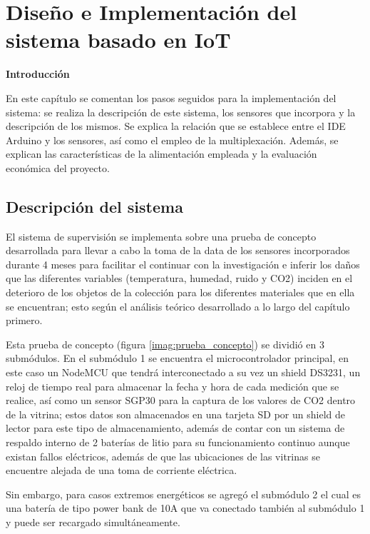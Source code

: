 \chapter{Diseño e Implementación del sistema basado en IoT}\label{cap: }

        \textbf{\Large Introducción}\vspace{0.5cm}
        
    En este capítulo se comentan los pasos seguidos para la implementación del sistema: se realiza la descripción de este sistema, los sensores que incorpora y la descripción de los mismos. 
    Se explica la relación que se establece entre el IDE Arduino y los sensores, así como el empleo de la multiplexación. Además, se explican las características de la alimentación empleada y la evaluación económica del proyecto.
    
\section{Descripción del sistema} \label{descripcion_sistema}

    El sistema de supervisión se implementa sobre una prueba de concepto desarrollada para llevar a cabo la toma de la data de los sensores incorporados durante 4 meses para facilitar el continuar con la investigación e inferir los daños que las diferentes variables (temperatura, humedad, ruido y CO2) inciden en el deterioro de los objetos de la colección para los diferentes materiales que en ella se encuentran; esto según el análisis teórico desarrollado a lo largo del capítulo primero.

    Esta prueba de concepto (figura \ref{imag:prueba_concepto}) se dividió en 3 submódulos. En el submódulo 1 se encuentra el microcontrolador principal, en este caso un NodeMCU que tendrá interconectado a su vez un shield DS3231, un reloj de tiempo real para almacenar la fecha y hora de cada medición que se realice, así como un sensor SGP30 para la captura de los valores de CO2 dentro de la vitrina; estos datos son almacenados en una tarjeta SD por un shield de lector para este tipo de almacenamiento, además de contar con un sistema de respaldo interno de 2 baterías de litio para su funcionamiento continuo aunque existan fallos eléctricos, además de que las ubicaciones de las vitrinas se encuentre alejada de una toma de corriente eléctrica.

    Sin embargo, para casos extremos energéticos se agregó el submódulo 2 el cual es una batería de tipo power bank de 10A que va conectado también al submódulo 1 y puede ser recargado simultáneamente.

